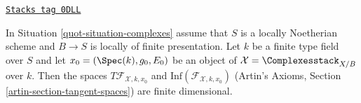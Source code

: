 \begin{lemma}
\label{quot-lemma-complexes-tangent-space}
\href{https://stacks.math.columbia.edu/tag/0DLL}{\texttt{Stacks tag 0DLL}}

In Situation \ref{quot-situation-complexes} assume that $S$ is a locally Noetherian
scheme and $B \to S$ is locally of finite presentation.
Let $k$ be a finite type field over $S$ and let
$x_0 = (\Spec(k), g_0, E_0)$
be an object of $\mathcal{X} = \Complexesstack_{X/B}$ over $k$.
Then the spaces $T\mathcal{F}_{\mathcal{X}, k, x_0}$ and
$\text{Inf}(\mathcal{F}_{\mathcal{X}, k, x_0})$
(Artin's Axioms, Section \ref{artin-section-tangent-spaces})
are finite dimensional.
\end{lemma}

